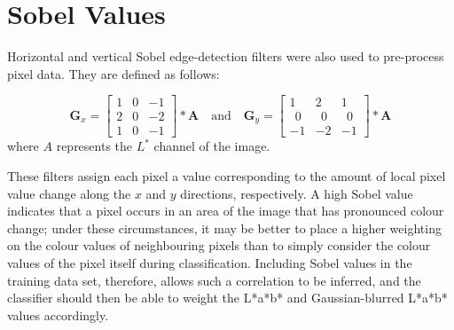 \section{Sobel Values}
Horizontal and vertical Sobel edge-detection filters were also used to pre-process pixel data. They are defined as follows:

$$ \mathbf{G}_x = 
\begin{bmatrix} 1 & 0 & -1 \\
2 & 0 & -2 \\
1 & 0 & -1 
\end{bmatrix} * \mathbf{A}
\quad
\mbox{and}
\quad   
\mathbf{G}_y = \begin{bmatrix} 
1 & 2 & 1  \\
\ \ 0 & \ \ 0 & \ \ 0 \\
-1 & -2 & -1 
\end{bmatrix} * \mathbf{A}
$$
where $A$ represents the $L^*$ channel of the image.

These filters assign each pixel a value corresponding to the amount of local pixel value change along the $x$ and $y$ directions, respectively.  A high Sobel value indicates that a pixel occurs in an area of the image that has pronounced colour change; under these circumstances, it may be better to place a higher weighting on the colour values of neighbouring pixels than to simply consider the colour values of the pixel itself during classification.  Including Sobel values in the training data set, therefore, allows such a correlation to be inferred, and the classifier should then be able to weight the L*a*b* and Gaussian-blurred L*a*b* values accordingly.